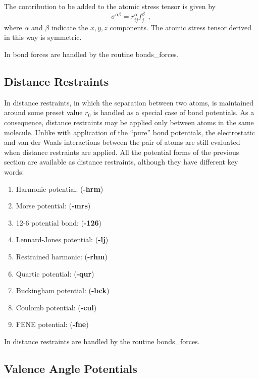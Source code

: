The contribution to be added to the atomic stress
tensor is given by
\begin{equation}
\sigma^{\alpha \beta} = r_{ij}^{\alpha} f_{j}^{\beta}~~,
\end{equation}
where $\alpha$ and $\beta$ indicate the $x,y,z$ components.  The
atomic stress tensor derived in this way is
symmetric.

In \D bond forces are handled by the routine {\sc bonds\_forces}.

\subsection{Distance Restraints}

In \D distance restraints, in which the separation between two
atoms, is maintained around some preset value $r_0$ is handled as
a special case of bond potentials.  As a consequence, distance
restraints may be applied only between atoms in the same molecule.
Unlike with application of the ``pure'' bond
potentials, the
electrostatic and van der
Waals interactions between the pair
of atoms are still evaluated when distance restraints are applied.
All the potential forms of the previous section are available as
distance restraints, although they have
different key words:

\begin{enumerate}
\item Harmonic potential:  ({\bf -hrm})
\item Morse potential:  ({\bf -mrs})
\item 12-6 potential bond:  ({\bf -126})
\item Lennard-Jones potential:  ({\bf -lj})
\item Restrained harmonic:  ({\bf -rhm})
\item Quartic potential:  ({\bf -qur})
\item Buckingham potential:  ({\bf -bck})
\item Coulomb potential:  ({\bf -cul})
\item FENE potential:  ({\bf -fne})
\end{enumerate}

In \D distance restraints are handled
by the routine {\sc bonds\_forces}.

\subsection{Valence Angle Potentials}

